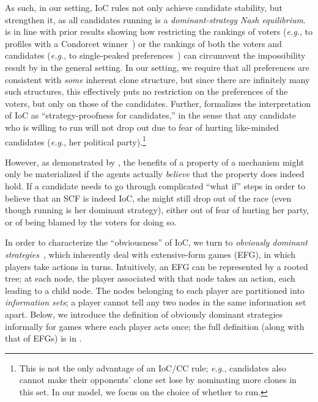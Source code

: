 As such, in our setting, IoC rules not only achieve candidate stability, but strengthen it, as all candidates running is a \emph{dominant-strategy Nash equilibrium}.  is in line with prior results showing how restricting the rankings of voters (\emph{e.g.}, to profiles with a Condorcet winner~\citep{Dutta01:Strategic}) or the rankings of both the voters and candidates (\emph{e.g.}, to single-peaked preferences~\citep{Samejima07-Strategic}) can circumvent the impossibility result by \citet{Dutta01:Strategic} in the general setting. In our setting, we require that all preferences are consistent with \emph{some} inherent clone structure, but since there are infinitely many such structures, this effectively puts no restriction on the preferences of the voters, but only on those of the candidates. Further,  formalizes the interpretation of IoC as ``strategy-proofness for candidates,'' in the sense that any candidate who is willing to run will not drop out due to fear of hurting  like-minded candidates (\emph{e.g.}, her political party).\footnote{This is not the only advantage of an IoC/CC rule; \emph{e.g.}, candidates also cannot make their opponents' clone set lose by nominating more clones in this set. In our model, we focus on the choice of whether to run.}

However, as demonstrated by \citet{Li17:Obviously}, the benefits of a property of a mechanism might only be materialized if the agents actually \emph{believe} that the property does indeed hold. If a candidate needs to go through complicated ``what if'' steps in order to believe that an SCF is indeed IoC, she might still drop out of the race (even though running is her dominant strategy), either out of fear of hurting her party, or of being blamed by the voters for doing so.

In order to characterize the ``obviousness'' of IoC, we turn to \emph{obviously dominant strategies}~\citep{Li17:Obviously}, which inherently deal with extensive-form games (EFG), in which players take actions in turns. Intuitively, an EFG can be represented by a rooted tree; at each node, the player associated with that node takes an action, each leading to a child node. The nodes belonging to each player are partitioned into \emph{information sets}; a player cannot tell any two nodes in the same information set apart. Below, we introduce the definition of obviously dominant strategies informally for games where each player acts once; the full definition (along with that of EFGs) is in .

